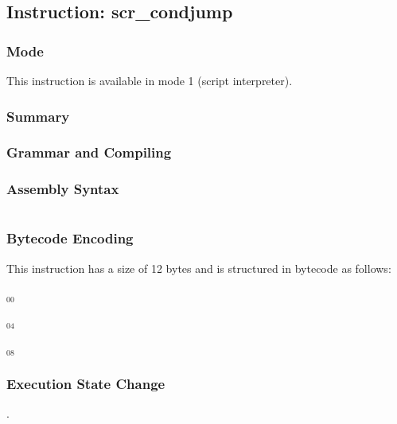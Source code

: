\subsection{Instruction: scr\_condjump}

\subsubsection{Mode}
This instruction is available in mode 1 (script interpreter).
\subsubsection{Summary}


\subsubsection{Grammar and Compiling}


\subsubsection{Assembly Syntax}

\begin{myquote}
\begin{verbatim}

\end{verbatim}
\end{myquote}

\subsubsection{Bytecode Encoding}

This instruction has a size of 12 bytes and is structured in bytecode as follows:

$_{00}$\ 



$_{04}$\ 



$_{08}$\ 
\fbox{%
  \parbox{20pt}{%
00
  }%
}

\subsubsection{Execution State Change}

.


